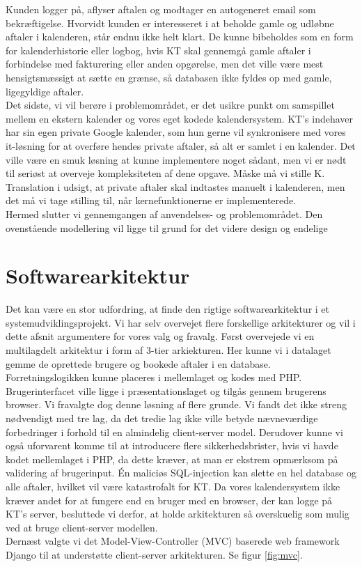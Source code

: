 \documentclass[12pt]{article}   %
\begin{document}
Kunden logger på, aflyser aftalen og modtager en autogeneret email som
bekræftigelse. Hvorvidt kunden er interesseret i at beholde gamle og udløbne aftaler 
i kalenderen, står endnu ikke helt klart. De kunne bibeholdes som en form for
kalenderhistorie eller logbog, hvis KT skal gennemgå gamle aftaler i
forbindelse med fakturering eller anden opgørelse, men det ville være mest
hensigtsmæssigt at sætte en grænse, så databasen ikke fyldes op med gamle,
ligegyldige aftaler.\\ 
Det sidste, vi vil berøre i problemområdet, er det usikre punkt om samspillet
mellem en ekstern kalender og vores eget kodede kalendersystem. KT's indehaver
har sin egen private Google kalender, som hun gerne vil synkronisere med vores
it-løsning for at overføre hendes private aftaler, så alt er samlet i en
kalender. Det ville være en smuk løsning at kunne implementere noget sådant,
men vi er nødt til seriøst at overveje kompleksiteten af dene opgave. Måske må
vi stille K. Translation i udsigt, at private aftaler skal indtastes manuelt i
kalenderen, men det må vi tage stilling til, når kernefunktionerne er
implementerede. \\
Hermed slutter vi gennemgangen af anvendelses- og problemområdet. Den
ovenstående modellering vil ligge til grund for det videre design og endelige


\section{Softwarearkitektur}
Det kan være en stor udfordring, at finde den rigtige softwarearkitektur i et
systemudviklingsprojekt. Vi har selv overvejet flere forskellige arkitekturer 
og vil i dette afsnit argumentere for vores valg og fravalg. Først overvejede
vi en multilagdelt arkitektur i form af 3-tier arkiekturen. Her kunne vi i
datalaget gemme de oprettede brugere og bookede aftaler i en database.
Forretningslogikken kunne placeres i mellemlaget og kodes med PHP.
Brugerinterfacet ville ligge i præsentationslaget og tilgås gennem brugerens
browser. Vi fravalgte dog denne løsning af flere grunde. Vi fandt det ikke
streng nødvendigt med tre lag, da det tredie lag ikke ville betyde
nævneværdige forbedringer i forhold til en almindelig client-server model.
Derudover kunne vi også uforvarent komme til at introducere flere
sikkerhedsbrister, hvis vi havde kodet mellemlaget i PHP, da dette kræver, at 
man er ekstrem opmærksom på validering af brugerinput. Én maliciøs SQL-injection
kan slette en hel database og alle aftaler, hvilket vil være katastrofalt for
KT. Da vores kalendersystem ikke kræver andet for at fungere end en bruger med
en browser, der kan logge på KT's server, besluttede vi derfor, at holde 
arkitekturen så overskuelig som mulig ved at bruge client-server modellen. \\
Dernæst valgte vi det Model-View-Controller (MVC) baserede web framework Django til
at understøtte client-server arkitekturen. Se figur \ref{fig:mvc}.\\
\end{document}

